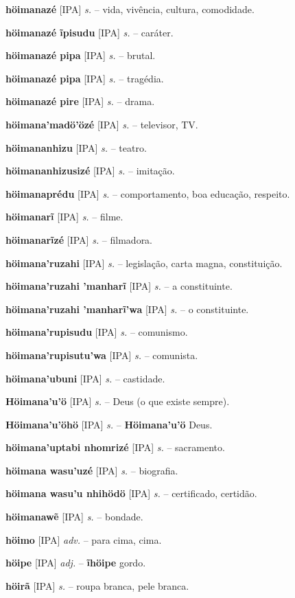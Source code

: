 \textbf{höimanazé} [IPA] \textit{s.} -- vida, vivência, cultura, comodidade.

\textbf{höimanazé ĩpisudu} [IPA] \textit{s.} -- caráter.

\textbf{höimanazé pipa} [IPA] \textit{s.} -- brutal.

\textbf{höimanazé pipa} [IPA] \textit{s.} -- tragédia.

\textbf{höimanazé pire} [IPA] \textit{s.} -- drama.

\textbf{höimana'madö'özé} [IPA] \textit{s.} -- televisor, TV.

\textbf{höimananhizu} [IPA] \textit{s.} -- teatro.

\textbf{höimananhizusizé} [IPA] \textit{s.} -- imitação.

\textbf{höimanaprédu} [IPA] \textit{s.} -- comportamento, boa educação, respeito.

\textbf{höimanarĩ} [IPA] \textit{s.} -- filme.

\textbf{höimanarĩzé} [IPA] \textit{s.} -- filmadora.

\textbf{höimana'ruzahi} [IPA] \textit{s.} -- legislação, carta magna, constituição.

\textbf{höimana'ruzahi 'manharĩ} [IPA] \textit{s.} -- a constituinte.

\textbf{höimana'ruzahi 'manharĩ'wa} [IPA] \textit{s.} -- o constituinte.

\textbf{höimana'rupisudu} [IPA] \textit{s.} -- comunismo.

\textbf{höimana'rupisutu'wa} [IPA] \textit{s.} -- comunista.

\textbf{höimana'ubuni} [IPA] \textit{s.} -- castidade.

\textbf{Höimana'u'ö} [IPA] \textit{s.} -- Deus (o que existe sempre).

\textbf{Höimana'u'öhö} [IPA] \textit{s.} -- \textbf{Höimana'u'ö} Deus.

\textbf{höimana'uptabi nhomrizé} [IPA] \textit{s.} -- sacramento.

\textbf{höimana wasu'uzé} [IPA] \textit{s.} -- biografia.

\textbf{höimana wasu'u nhihödö} [IPA] \textit{s.} -- certificado, certidão.

\textbf{höimanawẽ} [IPA] \textit{s.} -- bondade.

\textbf{höimo} [IPA] \textit{adv.} -- para cima, cima.

\textbf{höipe} [IPA] \textit{adj.} -- \textbf{ĩhöipe} gordo.

\textbf{höirã} [IPA] \textit{s.} -- roupa branca, pele branca.

